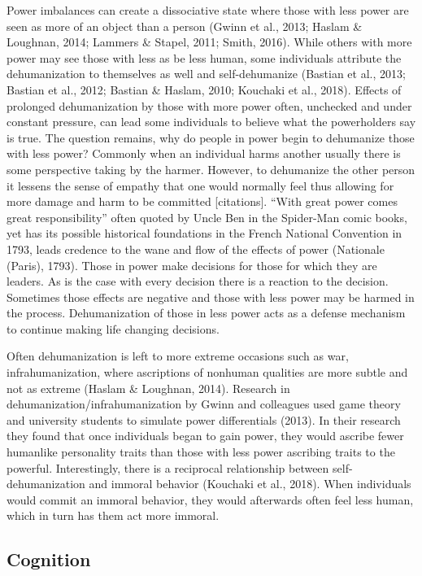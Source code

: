 \documentclass[
  donotrepeattitle,doc, 12pt, a4paper,floatsintext]{apa7}
\begin{document}
Power imbalances can create a dissociative state where those with less power are seen as more of an object than a person (Gwinn et al., 2013; Haslam \& Loughnan, 2014; Lammers \& Stapel, 2011; Smith, 2016). While others with more power may see those with less as be less human, some individuals attribute the dehumanization to themselves as well and self-dehumanize (Bastian et al., 2013; Bastian et al., 2012; Bastian \& Haslam, 2010; Kouchaki et al., 2018). Effects of prolonged dehumanization by those with more power often, unchecked and under constant pressure, can lead some individuals to believe what the powerholders say is true. The question remains, why do people in power begin to dehumanize those with less power? Commonly when an individual harms another usually there is some perspective taking by the harmer. However, to dehumanize the other person it lessens the sense of empathy that one would normally feel thus allowing for more damage and harm to be committed {[}citations{]}. ``With great power comes great responsibility'' often quoted by Uncle Ben in the Spider-Man comic books, yet has its possible historical foundations in the French National Convention in 1793, leads credence to the wane and flow of the effects of power (Nationale (Paris), 1793). Those in power make decisions for those for which they are leaders. As is the case with every decision there is a reaction to the decision. Sometimes those effects are negative and those with less power may be harmed in the process. Dehumanization of those in less power acts as a defense mechanism to continue making life changing decisions.

Often dehumanization is left to more extreme occasions such as war, infrahumanization, where ascriptions of nonhuman qualities are more subtle and not as extreme (Haslam \& Loughnan, 2014). Research in dehumanization/infrahumanization by Gwinn and colleagues used game theory and university students to simulate power differentials (2013). In their research they found that once individuals began to gain power, they would ascribe fewer humanlike personality traits than those with less power ascribing traits to the powerful. Interestingly, there is a reciprocal relationship between self-dehumanization and immoral behavior (Kouchaki et al., 2018). When individuals would commit an immoral behavior, they would afterwards often feel less human, which in turn has them act more immoral.

\hypertarget{cognition}{%
\subsection{Cognition}\label{cognition}}
\end{document}
